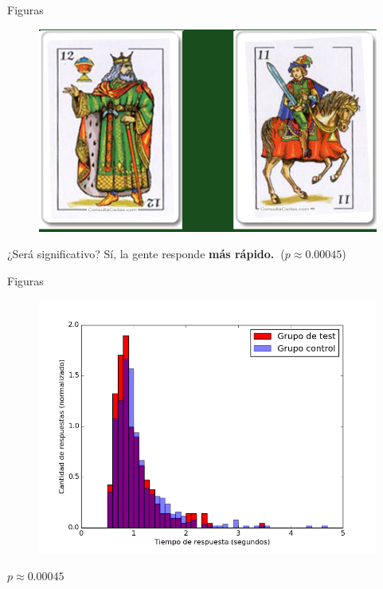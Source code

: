 \documentclass{beamer}
\begin{document}
\begin{frame}{Figuras}
\begin{figure}
   \includegraphics[width=0.8\linewidth]{examples_img/rondas_3.png}
\end{figure}
\begin{center}¿Será significativo?
\pause
Sí, la gente responde \textbf{más rápido.\ }($p \approx 0.00045$)
\end{center}
\end{frame}

\begin{frame}{Figuras}
\begin{figure}
   \includegraphics[width=0.9\linewidth]{graficos/rondas3vs5.png}
\end{figure}
\begin{center}$p \approx 0.00045$
\end{center}
\end{frame}
\end{document}
